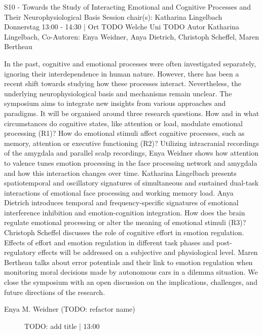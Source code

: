 
            \begin{symposium}
            {S10 - Towards the Study of Interacting Emotional and Cognitive Processes and Their Neurophysiological Basis}
            {Session chair(s): Katharina Lingelbach}
            {Donnerstag 13:00 - 14:30 | Ort TODO}
            {Welche Uni TODO}
            Autor Katharina Lingelbach, Co-Autoren: Enya Weidner, Anya Dietrich, Christoph Scheffel, Maren Bertheau

In the past, cognitive and emotional processes were often investigated separately, ignoring their interdependence in human nature. However, there has been a recent shift towards studying how these processes interact. Nevertheless, the underlying neurophysiological basis and mechanisms remain unclear.
The symposium aims to integrate new insights from various approaches and paradigms. It will be organised around three research questions. How and in what circumstances do cognitive states, like attention or load, modulate emotional processing (R1)? How do emotional stimuli affect cognitive processes, such as memory, attention or executive functioning (R2)?
Utilizing intracranial recordings of the amygdala and parallel scalp recordings, Enya Weidner shows how attention to valence tunes emotion processing in the face processing network and amygdala and how this interaction changes over time. Katharina Lingelbach presents spatiotemporal and oscillatory signatures of simultaneous and sustained dual-task interactions of emotional face processing and working memory load. Anya Dietrich introduces temporal and frequency-specific signatures of emotional interference inhibition and emotion-cognition integration.
How does the brain regulate emotional processing or alter the meaning of emotional stimuli (R3)?
Christoph Scheffel discusses the role of cognitive effort in emotion regulation. Effects of effort and emotion regulation in different task phases and post-regulatory effects will be addressed on a subjective and physiological level. Maren Bertheau talks about error potentials and their link to emotion regulation when monitoring moral decisions made by autonomous cars in a dilemma situation.
We close the symposium with an open discussion on the implications, challenges, and future directions of the research.
            \begin{description}    
            
                \item [Enya M. Weidner (TODO: refactor name)] TODO: add title \textcolor{mygray}{ | 13:00}    
                

\end{description}
\end{symposium}
